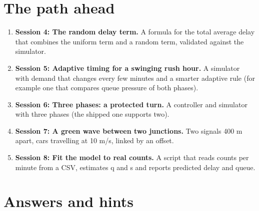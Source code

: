 \documentclass[11pt,a4paper]{article}
\begin{document}
\section{The path ahead}
\begin{enumerate}[nosep]
\item \textbf{Session 4: The random delay term.} A formula for the total average delay that combines the uniform term and a random term, validated against the simulator.
\item \textbf{Session 5: Adaptive timing for a swinging rush hour.} A simulator with demand that changes every few minutes and a smarter adaptive rule (for example one that compares queue pressure of both phases).
\item \textbf{Session 6: Three phases: a protected turn.} A controller and simulator with three phases (the shipped one supports two).
\item \textbf{Session 7: A green wave between two junctions.} Two signals 400 m apart, cars travelling at 10 m/s, linked by an offset.
\item \textbf{Session 8: Fit the model to real counts.} A script that reads counts per minute from a CSV, estimates q and s and reports predicted delay and queue.
\end{enumerate}

\section{Answers and hints}
\end{document}
